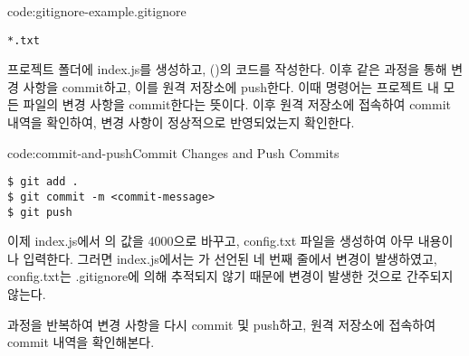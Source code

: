 \begin{codeenv}{code:gitignore-example}{.gitignore}\begin{verbatim}
*.txt
\end{verbatim}
\end{codeenv}

프로젝트 폴더에 index.js를 생성하고, (\pageref{code:nodejs-simple-web-server})의 코드를 작성한다. 이후 \와 같은 과정을 통해 변경 사항을 commit하고, 이를 원격 저장소에 push한다. 이때  명령어는 프로젝트 내 모든 파일의 변경 사항을 commit한다는 뜻이다. 이후 원격 저장소에 접속하여 commit 내역을 확인하여, 변경 사항이 정상적으로 반영되었는지 확인한다.

\begin{codeenv}{code:commit-and-push}{Commit Changes and Push Commits}\begin{verbatim}
$ git add .
$ git commit -m <commit-message>
$ git push
\end{verbatim}
\end{codeenv}

이제 index.js에서 의 값을 4000으로 바꾸고, config.txt 파일을 생성하여 아무 내용이나 입력한다. 그러면 index.js에서는 가 선언된 네 번째 줄에서 변경이 발생하였고, config.txt는 .gitignore에 의해 추적되지 않기 때문에 변경이 발생한 것으로 간주되지 않는다.

 과정을 반복하여 변경 사항을 다시 commit 및 push하고, 원격 저장소에 접속하여 commit 내역을 확인해본다.

